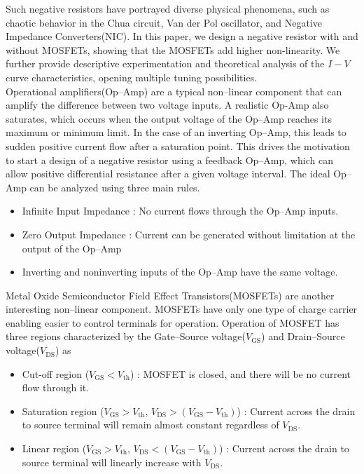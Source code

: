 \documentclass[%
 aip,
amsmath,amssymb,
reprint,
]{revtex4-1}
\begin{document}
Such negative resistors have portrayed diverse physical phenomena, such as chaotic behavior in the Chua circuit\cite{chua_circuit,impact_chua}, Van der Pol oscillator\cite{VanDerPol}, and Negative Impedance Converters(NIC)\cite{NIC_BJT,NIC_MOSFET,NIC_MOSFET2}. In this paper, we design a negative resistor with and without MOSFETs, showing that the MOSFETs add higher non-linearity. We further provide descriptive experimentation and theoretical analysis of the $I-V$ curve characteristics, opening multiple tuning possibilities.\\


Operational amplifiers(Op--Amp) are a typical non--linear component that can amplify the difference between two voltage inputs. A realistic Op-Amp also saturates, which occurs when the output voltage of the Op--Amp reaches its maximum or minimum limit. In the case of an inverting Op--Amp, this leads to sudden positive current flow after a saturation point. This drives the motivation to start a design of a negative resistor using a feedback Op--Amp, which can allow positive differential resistance after a given voltage interval.
The ideal Op--Amp can be analyzed using three main rules.
\begin{itemize}
    \item Infinite Input Impedance : No current flows through the Op--Amp inputs.
    \item Zero Output Impedance : Current can be generated without limitation at the output of the Op--Amp
    \item Inverting and noninverting inputs of the Op--Amp have the same voltage.
\end{itemize}

Metal Oxide Semiconductor Field Effect Transistors(MOSFETs) are another interesting non--linear component. MOSFETs have only one type of charge carrier enabling easier to control terminals for operation. Operation of MOSFET has three regions characterized by the Gate--Source voltage($V_{\textrm{GS}}$) and Drain--Source voltage($V_{\textrm{DS}}$) as

\begin{itemize}
    \item Cut-off region ($V_{\textrm{GS}}<V_{\textrm{th}}$) : MOSFET is closed, and there will be no current flow through it. 
    \item Saturation region ($V_{\textrm{GS}}>V_{\textrm{th}}$, $V_{\textrm{DS}}>(V_{\textrm{GS}}-V_{\textrm{th}})$) : Current across the drain to source terminal will remain almost constant regardless of $V_{\textrm{DS}}$.
    \item Linear region ($V_{\textrm{GS}}>V_{\textrm{th}}$, $V_{\textrm{DS}}<(V_{\textrm{GS}}-V_{\textrm{th}})$) : Current across the drain to source terminal will linearly increase with $V_{\textrm{DS}}$.
\end{itemize}
\end{document}
